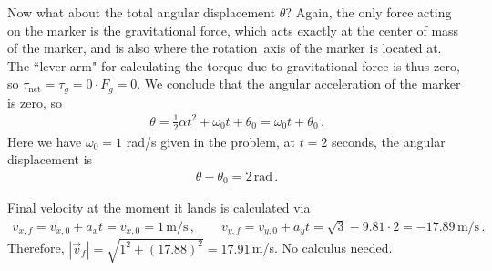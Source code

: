 \documentclass[11pt]{article}
\begin{document}
Now what about the total angular displacement $\theta$? Again, the only force acting on the marker is the gravitational force, which acts exactly at the center of mass of the marker, and is also where the rotation\ axis of the marker is located at. The ``lever arm" for calculating the torque due to gravitational force is thus zero, so $\tau_{\text{net}} = \tau_g = 0 \cdot F_g = 0$. We conclude that the angular acceleration of the marker is zero, so 
\begin{align*}
\theta = \frac{1}{2}\alpha t^2 + \omega_0 t + \theta_0 = \omega_0 t  + \theta_0\,.
\end{align*}
Here we have $\omega_0 = 1$ rad/s given in the problem, at $t = 2$ seconds, the angular displacement is 
\begin{align*}
\theta - \theta_0 = 2 \,\text{rad}\,.
\end{align*}

Final velocity at the moment it lands is calculated via
\begin{align*}
v_{x,f} = v_{x,0} + a_x t = v_{x,0} = 1 \,\text{m/s} \,,\qquad
v_{y,f} = v_{y,0} + a_y t = \sqrt{3}-9.81\cdot 2 = -17.89\,\text{m/s}\,.
\end{align*}
Therefore, $|\vec{v}_f| = \sqrt{1^2 + (17.88)^2} = 17.91$\,m/s. 
No calculus needed.\\
\end{document}
